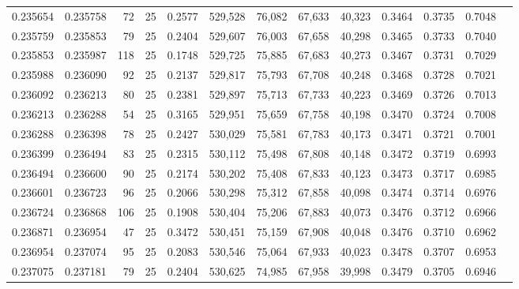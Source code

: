 \begin{tabular}{rrrrrrrrrrrrr}
0.235654 & 0.235758 &    72 &  25 &                                     0.2577 & 529,528 &  76,082 &  67,633 &  40,323 & 0.3464 & 0.3735 & 0.7048 \\
0.235759 & 0.235853 &    79 &  25 &                                     0.2404 & 529,607 &  76,003 &  67,658 &  40,298 & 0.3465 & 0.3733 & 0.7040 \\
0.235853 & 0.235987 &   118 &  25 &                                     0.1748 & 529,725 &  75,885 &  67,683 &  40,273 & 0.3467 & 0.3731 & 0.7029 \\
0.235988 & 0.236090 &    92 &  25 &                                     0.2137 & 529,817 &  75,793 &  67,708 &  40,248 & 0.3468 & 0.3728 & 0.7021 \\
0.236092 & 0.236213 &    80 &  25 &                                     0.2381 & 529,897 &  75,713 &  67,733 &  40,223 & 0.3469 & 0.3726 & 0.7013 \\
0.236213 & 0.236288 &    54 &  25 &                                     0.3165 & 529,951 &  75,659 &  67,758 &  40,198 & 0.3470 & 0.3724 & 0.7008 \\
0.236288 & 0.236398 &    78 &  25 &                                     0.2427 & 530,029 &  75,581 &  67,783 &  40,173 & 0.3471 & 0.3721 & 0.7001 \\
0.236399 & 0.236494 &    83 &  25 &                                     0.2315 & 530,112 &  75,498 &  67,808 &  40,148 & 0.3472 & 0.3719 & 0.6993 \\
0.236494 & 0.236600 &    90 &  25 &                                     0.2174 & 530,202 &  75,408 &  67,833 &  40,123 & 0.3473 & 0.3717 & 0.6985 \\
0.236601 & 0.236723 &    96 &  25 &                                     0.2066 & 530,298 &  75,312 &  67,858 &  40,098 & 0.3474 & 0.3714 & 0.6976 \\
0.236724 & 0.236868 &   106 &  25 &                                     0.1908 & 530,404 &  75,206 &  67,883 &  40,073 & 0.3476 & 0.3712 & 0.6966 \\
0.236871 & 0.236954 &    47 &  25 &                                     0.3472 & 530,451 &  75,159 &  67,908 &  40,048 & 0.3476 & 0.3710 & 0.6962 \\
0.236954 & 0.237074 &    95 &  25 &                                     0.2083 & 530,546 &  75,064 &  67,933 &  40,023 & 0.3478 & 0.3707 & 0.6953 \\
0.237075 & 0.237181 &    79 &  25 &                                     0.2404 & 530,625 &  74,985 &  67,958 &  39,998 & 0.3479 & 0.3705 & 0.6946 \\

\end{tabular}
